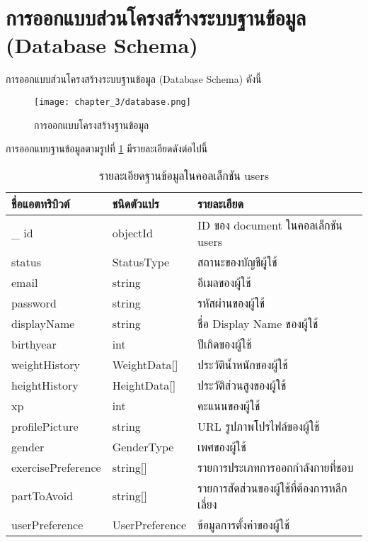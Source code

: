 \section{การออกแบบส่วนโครงสร้างระบบฐานข้อมูล (Database Schema)}

การออกแบบส่วนโครงสร้างระบบฐานข้อมูล (Database Schema) ดังนี้
\begin{figure}
    \texttt{[image: chapter\_3/database.png]}
    \caption{การออกแบบโครงสร้างฐานข้อมูล}
    \label{fig:db-schema}
\end{figure}
\clearpage
การออกแบบฐานข้อมูลตามรูปที่ \ref{fig:db-schema} มีรายละเอียดดังต่อไปนี้

\begin{table}
    \caption{รายละเอียดฐานข้อมูลในคอลเล็กชัน users}
    \begin{tabularx}{\textwidth}{ | l | l | X | }
        \hline
        \bf ชื่อแอตทริบิวต์ & \bf ชนิดตัวแปร & \bf รายละเอียด \\\hline
        \_ id & objectId & ID ของ document ในคอลเล็กชัน users\\\hline
        status & StatusType & สถานะของบัญชีผู้ใช้\\\hline
        email & string & อีเมลของผู้ใช้\\\hline
        password & string & รหัสผ่านของผู้ใช้\\\hline
        displayName & string & ชื่อ Display Name ของผู้ใช้\\\hline
        birthyear & int & ปีเกิดของผู้ใช้\\\hline
        weightHistory & WeightData[] & ประวัติน้ำหนักของผู้ใช้\\\hline
        heightHistory & HeightData[] & ประวัติส่วนสูงของผู้ใช้\\\hline
        xp & int & คะแนนของผู้ใช้\\\hline
        profilePicture & string & URL รูปภาพโปรไฟล์ของผู้ใช้\\\hline
        gender & GenderType & เพศของผู้ใช้\\\hline
        exercisePreference & string[] & รายการประเภทการออกกำลังกายที่ชอบ\\\hline
        partToAvoid & string[] & รายการสัดส่วนของผู้ใช้ที่ต้องการหลีกเลี่ยง\\\hline
        userPreference & UserPreference & ข้อมูลการตั้งค่าของผู้ใช้\\\hline
    \end{tabularx}
\end{table}

